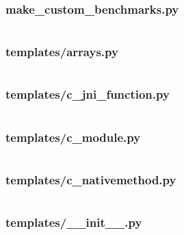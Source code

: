 \documentclass[a4paper,11pt]{article}
\begin{document}
\subsubsection{make\_custom\_benchmarks.py}
\inputminted[fontsize=\footnotesize, linenos, numbersep=5pt, tabsize=4, frame=topline,framesep=0.8cm]{python}{/home/tituomin/StudioProjects/nativebenchmark/script/make_custom_benchmarks.py}
\vspace{1cm}
\subsubsection{templates/arrays.py}
\inputminted[fontsize=\footnotesize, linenos, numbersep=5pt, tabsize=4, frame=topline,framesep=0.8cm]{python}{/home/tituomin/StudioProjects/nativebenchmark/script/templates/arrays.py}
\vspace{1cm}
\subsubsection{templates/c\_jni\_function.py}
\inputminted[fontsize=\footnotesize, linenos, numbersep=5pt, tabsize=4, frame=topline,framesep=0.8cm]{python}{/home/tituomin/StudioProjects/nativebenchmark/script/templates/c_jni_function.py}
\vspace{1cm}
\subsubsection{templates/c\_module.py}
\inputminted[fontsize=\footnotesize, linenos, numbersep=5pt, tabsize=4, frame=topline,framesep=0.8cm]{python}{/home/tituomin/StudioProjects/nativebenchmark/script/templates/c_module.py}
\vspace{1cm}
\subsubsection{templates/c\_nativemethod.py}
\inputminted[fontsize=\footnotesize, linenos, numbersep=5pt, tabsize=4, frame=topline,framesep=0.8cm]{python}{/home/tituomin/StudioProjects/nativebenchmark/script/templates/c_nativemethod.py}
\vspace{1cm}
\subsubsection{templates/\_\_init\_\_.py}
\inputminted[fontsize=\footnotesize, linenos, numbersep=5pt, tabsize=4, frame=topline,framesep=0.8cm]{python}{/home/tituomin/StudioProjects/nativebenchmark/script/templates/__init__.py}
\vspace{1cm}
\end{document}
